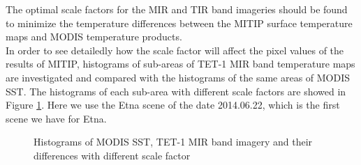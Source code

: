 \noindent The optimal scale factors for the MIR and TIR band imageries should be found to minimize the temperature differences between the MITIP surface temperature maps and MODIS temperature products.\\

\noindent In order to see detailedly how the scale factor will affect the pixel values of the results of MITIP, histograms of sub-areas of TET-1 MIR band temperature maps are investigated and compared with the histograms of the same areas of MODIS SST. The histograms of each sub-area with different scale factors are showed in Figure \ref{fig:hist_rect_all}. Here we use the Etna scene of the date 2014.06.22, which is the first scene we have for Etna.\\

\begin{figure}[!htbp]
\centering
{}
\vspace{0.1in}

\hspace{0.5in}

\vspace{0.1in}

\hspace{0.5in}

\vspace{0.1in}

\hspace{0.5in}

\vspace{0.1in}

\caption{Histograms of MODIS SST, TET-1 MIR band imagery and their differences with different scale factor}
\label{fig:hist_rect_all}
\end{figure}

